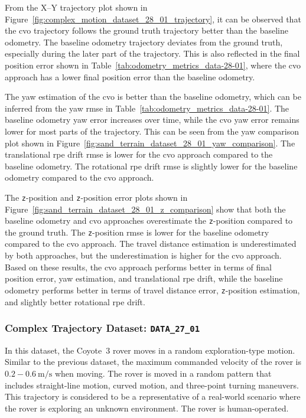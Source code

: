 \documentclass[report.tex]{subfiles}
\begin{document}
    
    From the X--Y trajectory plot shown in Figure~\ref{fig:complex_motion_dataset_28_01_trajectory}, it can be observed that the \gls{cvo} trajectory follows the ground truth trajectory better than the baseline odometry. The baseline odometry trajectory deviates from the ground truth, especially during the later part of the trajectory. This is also reflected in the final position error shown in Table~\ref{tab:odometry_metrics_data-28-01}, where the \gls{cvo} approach has a lower final position error than the baseline odometry.

    The yaw estimation of the \gls{cvo} is better than the baseline odometry, which can be inferred from the yaw \gls{rmse} in Table~\ref{tab:odometry_metrics_data-28-01}. The baseline odometry yaw error increases over time, while the \gls{cvo} yaw error remains lower for most parts of the trajectory. This can be seen from the yaw comparison plot shown in Figure~\ref{fig:sand_terrain_dataset_28_01_yaw_comparison}. The translational \gls{rpe} drift \gls{rmse} is lower for the \gls{cvo} approach compared to the baseline odometry. The rotational \gls{rpe} drift \gls{rmse} is slightly lower for the baseline odometry compared to the \gls{cvo} approach. 
    
    The \texttt{z}-position and \texttt{z}-position error plots shown in Figure~\ref{fig:sand_terrain_dataset_28_01_z_comparison} show that both the baseline odometry and \gls{cvo} approaches overestimate the \texttt{z}-position compared to the ground truth. The \texttt{z}-position \gls{rmse} is lower for the baseline odometry compared to the \gls{cvo} approach. The travel distance estimation is underestimated by both approaches, but the underestimation is higher for the \gls{cvo} approach. Based on these results, the \gls{cvo} approach performs better in terms of final position error, yaw estimation, and translational \gls{rpe} drift, while the baseline odometry performs better in terms of travel distance error, \texttt{z}-position estimation, and slightly better rotational \gls{rpe} drift.
    \FloatBarrier
 
    \subsubsection{Complex Trajectory Dataset: \texttt{DATA\_27\_01}} \label{subsubsec:complexTrajectoryD1_27_01}
    
    In this dataset, the Coyote~3 rover moves in a random exploration-type motion. Similar to the previous dataset, the maximum commanded velocity of the rover is $0.2-0.6~\mathrm{m/s}$ when moving. The rover is moved in a random pattern that includes straight-line motion, curved motion, and three-point turning maneuvers. This trajectory is considered to be a representative of a real-world scenario where the rover is exploring an unknown environment. The rover is human-operated. 
    
\end{document}
